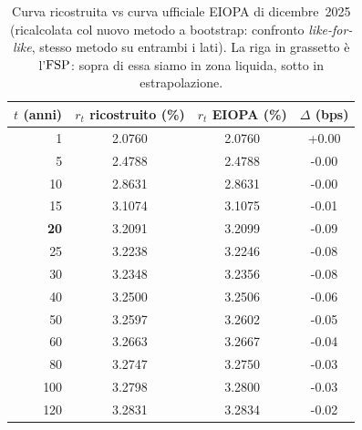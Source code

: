 \begin{table}[H]\centering\small
\caption{Curva ricostruita vs curva ufficiale EIOPA di dicembre~2025 (ricalcolata col nuovo metodo a bootstrap: confronto \emph{like-for-like}, stesso metodo su entrambi i lati). La riga in grassetto \`e l'$\mathrm{FSP}$: sopra di essa siamo in zona liquida, sotto in estrapolazione.}
\label{tab:confronto-eiopa}\renewcommand{\arraystretch}{1.15}
\begin{tabular}{rccc}
\toprule
$t$ (anni) & $r_t$ ricostruito (\%) & $r_t$ EIOPA (\%) & $\Delta$ (bps)\\
\midrule
\rowcolor{rowtint}1 & 2.0760 & 2.0760 & +0.00\\
5 & 2.4788 & 2.4788 & -0.00\\
\rowcolor{rowtint}10 & 2.8631 & 2.8631 & -0.00\\
15 & 3.1074 & 3.1075 & -0.01\\
\rowcolor{rowtint}\textbf{20} & 3.2091 & 3.2099 & -0.09\\
25 & 3.2238 & 3.2246 & -0.08\\
\rowcolor{rowtint}30 & 3.2348 & 3.2356 & -0.08\\
40 & 3.2500 & 3.2506 & -0.06\\
\rowcolor{rowtint}50 & 3.2597 & 3.2602 & -0.05\\
60 & 3.2663 & 3.2667 & -0.04\\
\rowcolor{rowtint}80 & 3.2747 & 3.2750 & -0.03\\
100 & 3.2798 & 3.2800 & -0.03\\
\rowcolor{rowtint}120 & 3.2831 & 3.2834 & -0.02\\
\bottomrule
\end{tabular}
\end{table}
